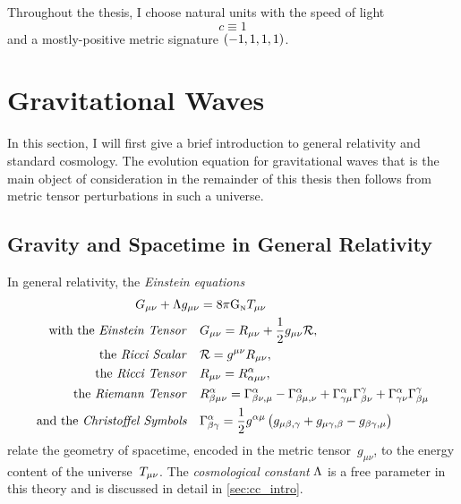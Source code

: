\documentclass[12pt,parskip=half]{scrreprt}
\begin{document}
Throughout the thesis, I choose natural units with the speed of light
\begin{equation}
	c \equiv 1
\end{equation}
and a mostly-positive metric signature \(\del{-1,1,1,1}\).


\section{Gravitational Waves}\label{sec:grav_waves}

In this section, I will first give a brief introduction to general relativity and standard \FLRW cosmology. The evolution equation for gravitational waves that is the main object of consideration in the remainder of this thesis then follows from metric tensor perturbations in such a universe.

\subsection{Gravity and Spacetime in General Relativity}\label{sec:gr}

In general relativity, the \emph{Einstein equations}
\begin{align}\label{eq:einstein_eqns}
	\Gtens_{\mu \nu} + \cosmconst g_{\mu\nu} &= 8 \pi \Newtconst \Ttens_{\mu \nu} \\
	\text{with the \emph{Einstein Tensor}} \quad &\Gtens_{\mu \nu} = \Rtens_{\mu \nu} + \frac{1}{2}g_{\mu \nu}\Rscal \eqpunct{,} \label{eq:einstein_tensor} \\
	\text{the \emph{Ricci Scalar}} \quad &\Rscal = g^{\mu \nu}\Rtens_{\mu \nu} \eqpunct{,} \\
	\text{the \emph{Ricci Tensor}} \quad &\Rtens_{\mu \nu} = \Riemtens^\alpha_{\alpha \mu \nu} \eqpunct{,} \\
	\text{the \emph{Riemann Tensor}} \quad &\Riemtens^\alpha_{\beta \mu \nu} = \Gamma^\alpha_{\beta \nu, \mu} - \Gamma^\alpha_{\beta \mu, \nu} + \Gamma^\alpha_{\gamma \mu}\Gamma^\gamma_{\beta \nu} + \Gamma^\alpha_{\gamma \nu}\Gamma^\gamma_{\beta \mu} \\
	\text{and the \emph{Christoffel Symbols}} \quad &\Gamma^\alpha_{\beta \gamma} = \frac{1}{2} g^{\alpha \mu} \del{g_{\mu \beta, \gamma} + g_{\mu \gamma, \beta} - g_{\beta \gamma, \mu}}
\end{align}
relate the geometry of spacetime, encoded in the metric tensor~\(g_{\mu \nu}\), to the energy content of the universe~\(T_{\mu \nu}\). The \emph{cosmological constant} \(\Lambda\) is a free parameter in this theory and is discussed in detail in \autoref{sec:cc_intro}.
\end{document}
